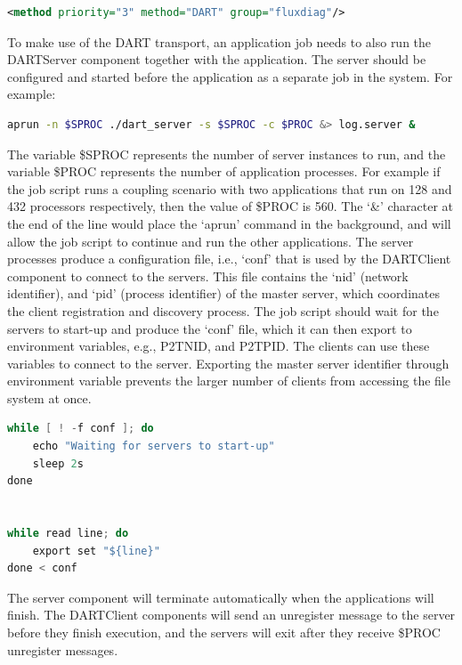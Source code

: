 \begin{lstlisting}[language=XML, caption=Select DART as a transport method in the configuration file example.]
<method priority="3" method="DART" group="fluxdiag"/>
\end{lstlisting}

To make use of the DART transport, an application job needs to also run the DARTServer 
component together with the application. The server should be configured and started 
before the application as a separate job in the system. For example:

\begin{lstlisting}[language=bash, caption=Start the server component in a job file first.]
aprun -n $SPROC ./dart_server -s $SPROC -c $PROC &> log.server &
\end{lstlisting}

The variable \$SPROC represents the number of server instances to run, and the 
variable \$PROC represents the number of application processes. For example if 
the job script runs a coupling scenario with two applications that run on 128 and 
432 processors respectively, then the value of \$PROC is 560. The `\&' character 
at the end of the line would place the `aprun' command in the background, and will 
allow the job script to continue and run the other applications. The server processes 
produce a configuration file, i.e., `conf' that is used by the DARTClient component 
to connect to the servers. This file contains the `nid' (network identifier), and 
`pid' (process identifier) of the master server, which coordinates the client registration 
and discovery process. The job script should wait for the servers to start-up and 
produce the `conf' file, which it can then export to environment variables, e.g., 
P2TNID, and P2TPID. The clients can use these variables to connect to the server. 
Exporting the master server identifier through environment variable prevents the 
larger number of clients from accessing the file system at once.

\begin{lstlisting}[language=C, caption=Wait for server start-up completion and export the configuration to environment variables.]
while [ ! -f conf ]; do
	echo "Waiting for servers to start-up"
	sleep 2s
done


while read line; do
	export set "${line}"
done < conf
\end{lstlisting}

The server component will terminate automatically when the applications will finish. 
The DARTClient components will send an unregister message to the server before 
they finish execution, and the servers will exit after they receive \$PROC unregister 
messages.

